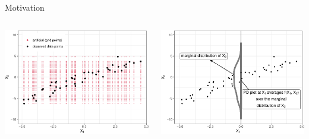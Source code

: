 \documentclass[11pt,compress,t,notes=noshow, xcolor=table]{beamer}
\begin{document}
\begin{vbframe}{Motivation}

\begin{columns}[T]
\begin{column}{0.5\textwidth}
\centering
\includegraphics[width=\textwidth]{figure_man/ale_scatter_grid}
\end{column}
\begin{column}{0.5\textwidth}
\centering
\includegraphics[width=\textwidth]{figure_man/ale_pdplot}
\end{column}
\end{columns}



\end{vbframe}
\end{document}
